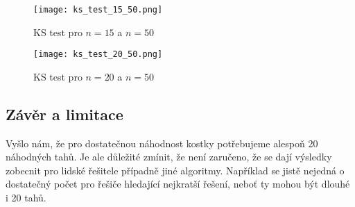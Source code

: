\documentclass{article}
\begin{document}
\begin{figure}[h]
    \centering
    \begin{minipage}{0.49\textwidth}
        \centering
        \texttt{[image: ks\_test\_15\_50.png]}
        \caption{KS test pro $n = 15$ a $n = 50$}
        \label{fig:ks_test_15_50}
    \end{minipage}
    \hfill
    \begin{minipage}{0.49\textwidth}
        \centering
        \texttt{[image: ks\_test\_20\_50.png]}
        \caption{KS test pro $n = 20$ a $n = 50$}
        \label{fig:ks_test_20_50}
    \end{minipage}
\end{figure}

\subsection*{Závěr a limitace}
Vyšlo nám, že pro dostatečnou náhodnost kostky potřebujeme alespoň 20 náhodných tahů.
Je ale důležité zmínit, že není zaručeno, že se dají výsledky zobecnit pro lidské řešitele případně jiné algoritmy.
Například se jistě nejedná o dostatečný počet pro řešiče hledající nejkratší řešení,
neboť ty mohou být dlouhé i 20 tahů.
\end{document}
